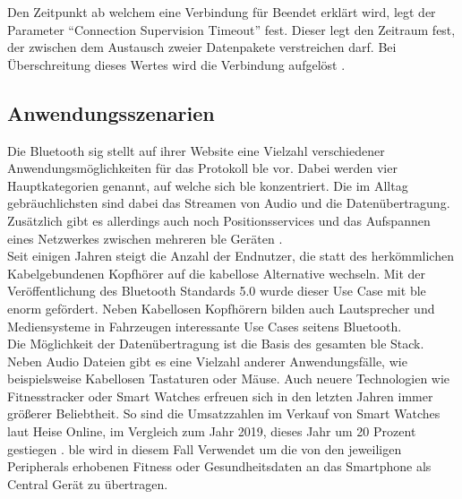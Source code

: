 \noindent Den Zeitpunkt ab welchem eine Verbindung für Beendet erklärt wird, legt der Parameter "`Connection Supervision Timeout"' fest. Dieser legt den Zeitraum fest, der zwischen dem Austausch zweier Datenpakete verstreichen darf. Bei Überschreitung dieses Wertes wird die Verbindung aufgelöst \cite[Seite 22f]{Townsend14:GSB}.\\

\subsection{Anwendungsszenarien}
\label{ss:funktionsweise:anwendungen}

\noindent Die Bluetooth \ac{sig} stellt auf ihrer Website eine Vielzahl verschiedener Anwendungsmöglichkeiten für das Protokoll \ac{ble} vor. Dabei werden vier Hauptkategorien genannt, auf welche sich \ac{ble} konzentriert. Die im Alltag gebräuchlichsten sind dabei das Streamen von Audio und die Datenübertragung. Zusätzlich gibt es allerdings auch noch Positionsservices und das Aufspannen eines Netzwerkes zwischen mehreren \ac{ble} Geräten \cite{BLU20:WWW}.\\

\noindent Seit einigen Jahren steigt die Anzahl der Endnutzer, die statt des herkömmlichen Kabelgebundenen Kopfhörer auf die kabellose Alternative wechseln. Mit der Veröffentlichung des Bluetooth Standards 5.0 wurde dieser Use Case mit \ac{ble} enorm gefördert. Neben Kabellosen Kopfhörern bilden auch Lautsprecher und Mediensysteme in Fahrzeugen interessante Use Cases seitens Bluetooth.\\

\noindent Die Möglichkeit der Datenübertragung ist die Basis des gesamten \ac{ble} Stack. Neben Audio Dateien gibt es eine Vielzahl anderer Anwendungsfälle, wie beispielsweise Kabellosen Tastaturen oder Mäuse. Auch neuere Technologien wie Fitnesstracker oder Smart Watches erfreuen sich in den letzten Jahren immer größerer Beliebtheit. So sind die Umsatzzahlen im Verkauf von Smart Watches laut Heise Online, im Vergleich zum Jahr 2019, dieses Jahr um 20 Prozent gestiegen \cite{HEI20:WWW}. \ac{ble} wird in diesem Fall Verwendet um die von den jeweiligen Peripherals erhobenen Fitness oder Gesundheitsdaten an das Smartphone als Central Gerät zu übertragen.\\

